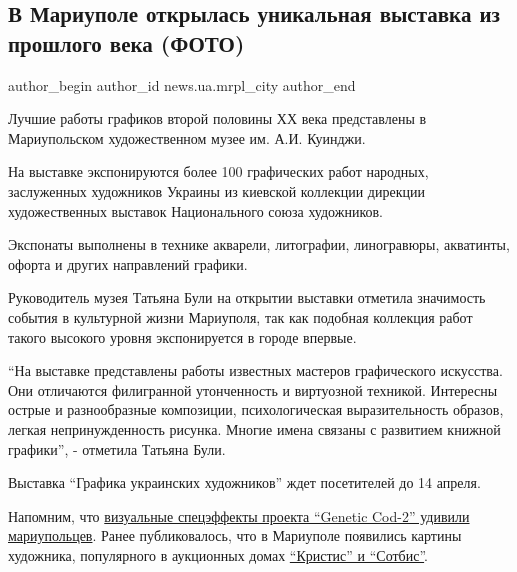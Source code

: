  
 
 
 
 
 
\subsection{В Мариуполе открылась уникальная выставка из прошлого века (ФОТО)}
\label{sec:08_03_2019.stz.news.ua.mrpl_city.1.vystavka_muzej_kuindzhi}
 
\ifcmt
 author_begin
   author_id news.ua.mrpl_city
 author_end
\fi

Лучшие работы графиков второй половины ХХ века представлены в Мариупольском
художественном музее им. А.И. Куинджи.

На выставке экспонируются более 100 графических работ народных, заслуженных
художников Украины из киевской коллекции дирекции художественных выставок
Национального союза художников.

Экспонаты выполнены в технике акварели, литографии, линогравюры, акватинты,
офорта и других направлений графики.

Руководитель музея Татьяна Були на открытии выставки отметила значимость
события в культурной жизни Мариуполя, так как подобная коллекция работ такого
высокого уровня экспонируется в городе впервые.

\enquote{На выставке представлены работы известных мастеров графического искусства. Они
отличаются филигранной утонченность и виртуозной техникой. Интересны острые и
разнообразные композиции, психологическая выразительность образов, легкая
непринужденность рисунка. Многие имена связаны с развитием книжной графики}, -
отметила Татьяна Були.

Выставка \enquote{Графика украинских художников} ждет посетителей до 14 апреля.

Напомним, что \href{https://mrpl.city/news/view/proekt-genetic-cod-2-vizualnye-spetse-ffekty-udivili-mariupoltsev-foto}{визуальные спецэффекты проекта \enquote{Genetic Cod-2} удивили
мариупольцев}. Ранее публиковалось, что в Мариуполе появились картины художника,
популярного в аукционных домах \href{https://mrpl.city/news/view/-341}{\enquote{Кристис} и \enquote{Сотбис}}.
